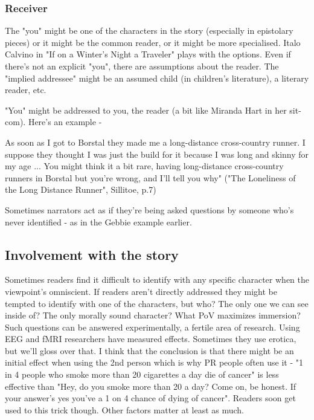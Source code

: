 \documentclass[11pt]{article}
\newenvironment{narrow}[2]{%
 \begin{list}{}{%
  \setlength{\topsep}{0pt}%
  \setlength{\leftmargin}{#1}%
  \setlength{\rightmargin}{#2}%
  \setlength{\listparindent}{\parindent}%
  \setlength{\itemindent}{\parindent}%
  \setlength{\parsep}{\parskip}%
 }%
\item[]}{\end{list}}
\begin{document}
\subsubsection*{Receiver}
The "you" might be one of the characters in the story (especially in epistolary pieces) or it might be the common reader, or it might be more specialised. Italo Calvino in "If on a Winter's Night a Traveler" plays with the options. Even if there's not an explicit "you", there are assumptions about the reader. The "implied addressee" might be an assumed child (in children's literature), a literary reader, etc.



"You" might be addressed to you, the reader (a bit like Miranda Hart in her sit-com). Here's an example -

\begin{narrow}{1.0cm}{1.0cm} 
As soon as I got to Borstal they made me a long-distance cross-country runner. 
I suppose they thought I was just the build for it because I was long and 
skinny for my age ... You might think it a bit rare, having long-distance 
cross-country runners in Borstal but you're wrong, and I'll tell you why"
 ("The Loneliness of the Long Distance Runner", Sillitoe, p.7)
\end{narrow}

Sometimes narrators act as if they're being asked questions by someone who's never identified - as in the Gebbie example earlier.

 

\subsection*{Involvement with the story}
Sometimes readers find it difficult to identify with any specific character when the viewpoint's omniscient. If readers aren't directly addressed they might be tempted to identify with one of the characters, but who? The only one we can see inside of? The only morally sound character?  What PoV maximizes immersion? Such questions can be answered experimentally, a fertile area of research. Using EEG and fMRI researchers have measured effects. Sometimes they use erotica, but we'll gloss over that. I think that the conclusion is that there might be an initial effect when using the 2nd person which is why PR people often use it - "1 in 4 people who smoke more than 20 cigarettes a day die of cancer" is less effective than "Hey, do you smoke more than 20 a day? Come on, be honest. If your answer's yes you've a 1 on 4 chance of dying of cancer". Readers soon get used to this trick though. Other factors matter at least as much.
\end{document}
